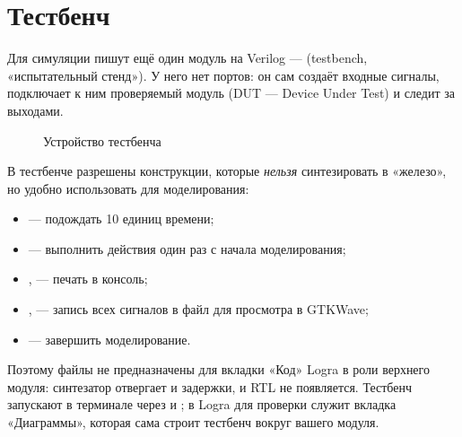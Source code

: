 \section{Тестбенч}

Для симуляции пишут ещё один модуль на Verilog ---  (testbench,
«испытательный стенд»). У него нет портов: он сам создаёт входные сигналы,
подключает к ним проверяемый модуль (DUT --- Device Under Test) и
следит за выходами.

\begin{figure}[H]
\centering
{}
\caption{Устройство тестбенча}
\end{figure}

В тестбенче разрешены конструкции, которые \emph{нельзя} синтезировать в
«железо», но удобно использовать для моделирования:
\begin{itemize}
  \item {} --- подождать 10 единиц времени;
  \item {} --- выполнить действия один раз с начала
        моделирования;
  \item {},  --- печать в консоль;
  \item {},  --- запись всех сигналов в файл
         для просмотра в GTKWave;
  \item {} --- завершить моделирование.
\end{itemize}

Поэтому файлы  не предназначены для вкладки «Код» Logra в роли
верхнего модуля: синтезатор отвергает  и задержки, и RTL не
появляется. Тестбенч запускают в терминале через  и ;
в Logra для проверки служит вкладка «Диаграммы», которая сама строит тестбенч
вокруг вашего модуля.


